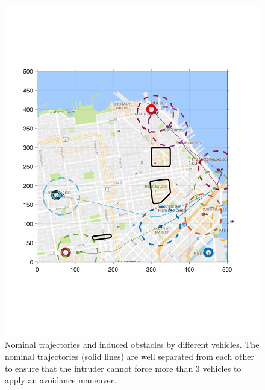 \begin{figure}[H]
  \centering
  \includegraphics[width=\columnwidth]{"figs/nomTraj"}
  \caption{Nominal trajectories and induced obstacles by different vehicles. The nominal trajectories (solid lines) are well separated from each other to ensure that the intruder cannot force more than 3 vehicles to apply an avoidance maneuver.}
  \label{fig:trajObsSim}
\end{figure}

